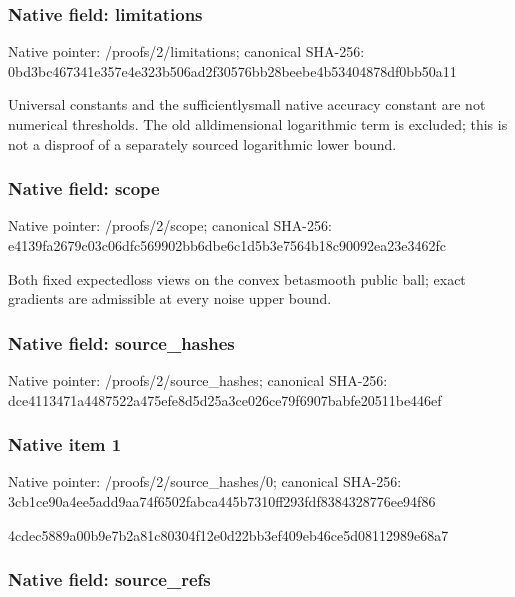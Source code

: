 \documentclass[10pt,a4paper]{article}
\begin{document}
\subsubsection{Native field: limitations}


Native pointer: /proofs/2/limitations; canonical SHA-256: 0bd3bc467341e357e4e323b5\allowbreak{}06ad2f30576bb28beebe4b53\allowbreak{}404878df0bb50a11


Universal constants and the sufficientlysmall native accuracy constant are not numerical thresholds. The old alldimensional logarithmic term is excluded; this is not a disproof of a separately sourced logarithmic lower bound.


\subsubsection{Native field: scope}


Native pointer: /proofs/2/scope; canonical SHA-256: e4139fa2679c03c06dfc5699\allowbreak{}02bb6dbe6c1d5b3e7564b18c\allowbreak{}90092ea23e3462fc


Both fixed expectedloss views on the convex betasmooth public ball; exact gradients are admissible at every noise upper bound.


\subsubsection{Native field: source\_hashes}


Native pointer: /proofs/2/source\_hashes; canonical SHA-256: dce4113471a4487522a475ef\allowbreak{}e8d5d25a3ce026ce79f6907b\allowbreak{}abfe20511be446ef



\subsubsection{Native item 1}


Native pointer: /proofs/2/source\_hashes/0; canonical SHA-256: 3cb1ce90a4ee5add9aa74f65\allowbreak{}02fabca445b7310ff293fdf8\allowbreak{}384328776ee94f86


4cdec5889a00b9e7b2a81c80\allowbreak{}304f12e0d22bb3ef409eb46c\allowbreak{}e5d08112989e68a7


\subsubsection{Native field: source\_refs}
\end{document}
